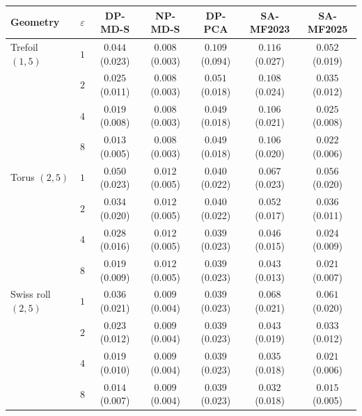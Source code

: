 \begin{tabular}{lcccccc}
\toprule
Geometry & $\varepsilon$ & DP-MD-S & NP-MD-S & DP-PCA & SA-MF2023 & SA-MF2025 \\
\midrule
Trefoil $(1,5)$ & $1$ & $0.044$ \scriptsize(0.023) & $0.008$ \scriptsize(0.003) & $0.109$ \scriptsize(0.094) & $0.116$ \scriptsize(0.027) & $0.052$ \scriptsize(0.019) \\
 & $2$ & $0.025$ \scriptsize(0.011) & $0.008$ \scriptsize(0.003) & $0.051$ \scriptsize(0.018) & $0.108$ \scriptsize(0.024) & $0.035$ \scriptsize(0.012) \\
 & $4$ & $0.019$ \scriptsize(0.008) & $0.008$ \scriptsize(0.003) & $0.049$ \scriptsize(0.018) & $0.106$ \scriptsize(0.021) & $0.025$ \scriptsize(0.008) \\
 & $8$ & $0.013$ \scriptsize(0.005) & $0.008$ \scriptsize(0.003) & $0.049$ \scriptsize(0.018) & $0.106$ \scriptsize(0.020) & $0.022$ \scriptsize(0.006) \\
\midrule
Torus $(2,5)$ & $1$ & $0.050$ \scriptsize(0.023) & $0.012$ \scriptsize(0.005) & $0.040$ \scriptsize(0.022) & $0.067$ \scriptsize(0.023) & $0.056$ \scriptsize(0.020) \\
 & $2$ & $0.034$ \scriptsize(0.020) & $0.012$ \scriptsize(0.005) & $0.040$ \scriptsize(0.022) & $0.052$ \scriptsize(0.017) & $0.036$ \scriptsize(0.011) \\
 & $4$ & $0.028$ \scriptsize(0.016) & $0.012$ \scriptsize(0.005) & $0.039$ \scriptsize(0.023) & $0.046$ \scriptsize(0.015) & $0.024$ \scriptsize(0.009) \\
 & $8$ & $0.019$ \scriptsize(0.009) & $0.012$ \scriptsize(0.005) & $0.039$ \scriptsize(0.023) & $0.043$ \scriptsize(0.013) & $0.021$ \scriptsize(0.007) \\
\midrule
Swiss roll $(2,5)$ & $1$ & $0.036$ \scriptsize(0.021) & $0.009$ \scriptsize(0.004) & $0.039$ \scriptsize(0.023) & $0.068$ \scriptsize(0.021) & $0.061$ \scriptsize(0.020) \\
 & $2$ & $0.023$ \scriptsize(0.012) & $0.009$ \scriptsize(0.004) & $0.039$ \scriptsize(0.023) & $0.043$ \scriptsize(0.019) & $0.033$ \scriptsize(0.012) \\
 & $4$ & $0.019$ \scriptsize(0.010) & $0.009$ \scriptsize(0.004) & $0.039$ \scriptsize(0.023) & $0.035$ \scriptsize(0.018) & $0.021$ \scriptsize(0.006) \\
 & $8$ & $0.014$ \scriptsize(0.007) & $0.009$ \scriptsize(0.004) & $0.039$ \scriptsize(0.023) & $0.032$ \scriptsize(0.018) & $0.015$ \scriptsize(0.005) \\

\end{tabular}
